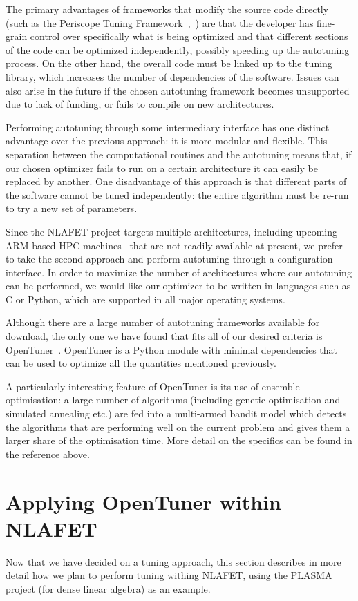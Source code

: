 \documentclass[a4paper,12pt]{article}
\begin{document}
The primary advantages of frameworks that modify the
source code directly
(such as the
Periscope Tuning Framework~\cite{mice13},~\cite{ptf14})
are that the developer has fine-grain control over specifically what
is being optimized and that different sections of the code can be
optimized independently,
possibly speeding up the autotuning process.
On the other hand,
the overall code must be linked up to the tuning library,
which increases the number of dependencies of the software.
Issues can also arise in the future if the chosen
autotuning framework becomes unsupported due to lack of funding,
or fails to compile on new architectures.

Performing autotuning through some intermediary interface
has one distinct advantage over the previous approach:
it is more modular and flexible.
This separation between the computational routines and the
autotuning means that,
if our chosen optimizer fails to run on a certain architecture
it can easily be replaced by another.
One disadvantage of this approach is that different parts of the software
cannot be tuned independently:
the entire algorithm must be re-run to try a new set of parameters.

Since the NLAFET project targets multiple architectures, including
upcoming ARM-based HPC machines~\cite{armhpc16} that are not
readily available at present, we prefer to take the second approach
and perform autotuning through a configuration interface.  In order to
maximize the number of architectures where our autotuning can be
performed, we would like our optimizer to be written in languages such
as C or Python, which are supported in all major operating systems.

Although there are a large number of autotuning frameworks
available for download,
the only one we have found that fits all of our desired
criteria is OpenTuner~\cite{ansel:pact:2014}.
OpenTuner is a Python module with minimal dependencies that
can be used to optimize all the quantities mentioned previously.

A particularly interesting feature of OpenTuner
is its use of ensemble optimisation:
a large number of algorithms
(including genetic optimisation and simulated annealing etc.)
are fed into a multi-armed bandit model
which detects the algorithms that are performing well on the current
problem and gives them a larger share of the optimisation time.
More detail on the specifics can be found in the reference above.

\section{Applying OpenTuner within NLAFET}
\label{sec:opentuner}
Now that we have decided on a tuning approach,
this section describes in more detail how we plan to
perform tuning withing NLAFET,
using the PLASMA project (for dense linear algebra)
as an example.
\end{document}
